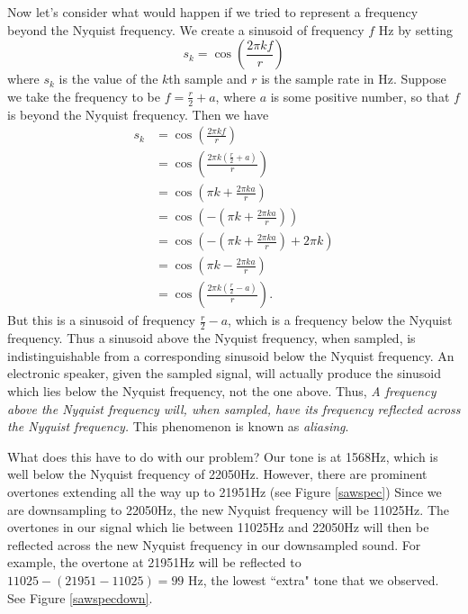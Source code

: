 Now let's consider what would happen if we tried to represent a frequency beyond the Nyquist frequency.
We create a sinusoid of frequency $f$ Hz by setting
$$s_k = \cos\left(\frac{2\pi kf}r\right)$$
where $s_k$ is the value of the $k$th sample and $r$ is the sample rate in Hz.
Suppose we take the frequency to be $f=\frac{r}2+a$, where $a$ is some positive number, so that $f$ is beyond the Nyquist frequency.
Then we have
\begin{align*}
s_k &= \cos\left(\frac{2\pi kf}r\right) \\
&= \cos\left(\frac{2\pi k(\frac{r}2+a)}r\right)\\
&= \cos\left(\pi k+\frac{2\pi ka}r\right)\\
&= \cos\left(-\left(\pi k+\frac{2\pi ka}r\right)\right)\\
&= \cos\left(-\left(\pi k+\frac{2\pi ka}r\right)+2\pi k \right)\\
&= \cos\left(\pi k-\frac{2\pi ka}r\right)\\
&= \cos\left(\frac{2\pi k(\frac{r}2-a)}r\right).
\end{align*}
But this is a sinusoid of frequency $\frac{r}2-a$, which is a frequency below the Nyquist frequency.
Thus a sinusoid above the Nyquist frequency, when sampled, is indistinguishable from a corresponding sinusoid below the Nyquist frequency.
An electronic speaker, given the sampled signal, will actually produce the sinusoid which lies below the Nyquist frequency, not the one above.
Thus, \emph{A frequency above the Nyquist frequency will, when sampled, have its frequency reflected across the Nyquist frequency.}
This phenomenon is known as \emph{aliasing}.

What does this have to do with our problem?
Our tone is at 1568Hz, which is well below the Nyquist frequency of 22050Hz.
However, there are prominent overtones extending all the way up to 21951Hz (see Figure \ref{sawspec})
Since we are downsampling to 22050Hz, the new Nyquist frequency will be 11025Hz.
The overtones in our signal which lie between 11025Hz and 22050Hz will then be reflected across the new Nyquist frequency in our downsampled sound.
For example, the overtone at 21951Hz will be reflected to $11025-(21951-11025)=99$ Hz, the lowest ``extra" tone that we observed.
See Figure \ref{sawspecdown}.

